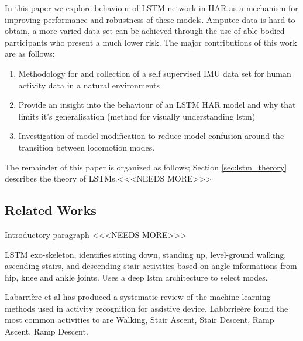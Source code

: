\documentclass[sensors,article,submit,moreauthors,pdftex]{Definitions/mdpi}
\begin{document}
In this paper we explore behaviour of LSTM network in HAR as a mechanism for improving performance and robustness of these models. Amputee data is hard to obtain, a more varied data set can be achieved through the use of able-bodied participants who present a much lower risk. The major contributions of this work are as follows:
\begin{enumerate}
\item Methodology for and collection of a self supervised IMU data set for human activity data in a natural environments
\item Provide an insight into the behaviour of an LSTM HAR model and why that limits it's generalisation (method for visually understanding lstm)
\item Investigation of model modification to reduce model confusion around the transition between locomotion modes.
\end{enumerate}

The remainder of this paper is organized as follows; Section \ref{sec:lstm_therory} describes the theory of LSTMs.<<<NEEDS MORE>>>

\subsection{Related Works}
\label{sec:related_works}
Introductory paragraph <<<NEEDS MORE>>>

LSTM exo-skeleton\cite{Wang2018}, identifies sitting down, standing up, level-ground walking, ascending stairs, and descending stair activities based on angle informations from hip, knee and ankle joints. Uses a deep lstm architecture to select modes.

Labarri\`ere et al has produced a systematic review of the machine learning methods used in activity recognition for assistive device\cite{Labarriere2020}. Labbrrie\`ere found the most common activities to are Walking, Stair Ascent, Stair Descent, Ramp Ascent, Ramp Descent.
\end{document}
